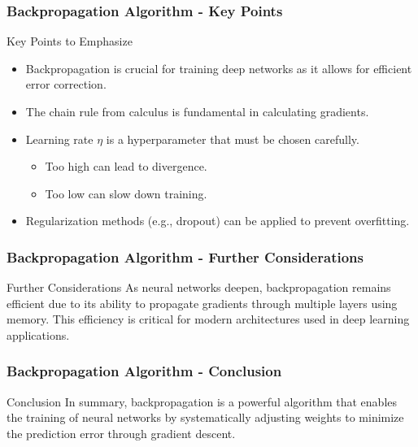 \documentclass{beamer}
\begin{document}
\begin{frame}[fragile]
    \frametitle{Backpropagation Algorithm - Key Points}
    \begin{block}{Key Points to Emphasize}
        \begin{itemize}
            \item Backpropagation is crucial for training deep networks as it allows for efficient error correction.
            \item The chain rule from calculus is fundamental in calculating gradients.
            \item Learning rate \( \eta \) is a hyperparameter that must be chosen carefully.
            \begin{itemize}
                \item Too high can lead to divergence.
                \item Too low can slow down training.
            \end{itemize}
            \item Regularization methods (e.g., dropout) can be applied to prevent overfitting.
        \end{itemize}
    \end{block}
\end{frame}

\begin{frame}[fragile]
    \frametitle{Backpropagation Algorithm - Further Considerations}
    \begin{block}{Further Considerations}
        As neural networks deepen, backpropagation remains efficient due to its ability to propagate gradients through multiple layers using memory. This efficiency is critical for modern architectures used in deep learning applications.
    \end{block}
\end{frame}

\begin{frame}[fragile]
    \frametitle{Backpropagation Algorithm - Conclusion}
    \begin{block}{Conclusion}
        In summary, backpropagation is a powerful algorithm that enables the training of neural networks by systematically adjusting weights to minimize the prediction error through gradient descent.
    \end{block}
\end{frame}
\end{document}
